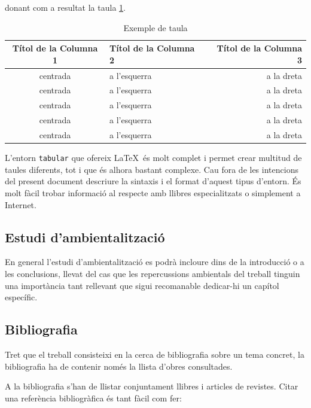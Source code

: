 donant com a resultat la taula \ref{T:prova}.


\begin{table}[htb]
\caption{Exemple de taula}
\begin{center}
\begin{tabular}{|c|l|r|}
\hline
{\bf Títol de la Columna 1} & {\bf Títol de la Columna 2} & {\bf Títol de la Columna 3}  \\ \hline \hline
centrada        & a l'esquerra    & a la dreta       \\ \hline
centrada        & a l'esquerra    & a la dreta       \\ \hline
centrada        & a l'esquerra    & a la dreta       \\ \hline
centrada        & a l'esquerra    & a la dreta       \\ \hline
centrada        & a l'esquerra    & a la dreta       \\ \hline
\end{tabular}
\label{T:prova}
\end{center}
\end{table}

L'entorn \texttt{tabular} que ofereix \LaTeX \ és molt complet i permet crear multitud de taules diferents, tot i que és alhora bastant complexe. Cau fora de les intencions del present document descriure la sintaxis i el format d'aquest tipus d'entorn. És molt fàcil trobar informació al respecte amb llibres especialitzats o simplement a Internet. 


\subsection{Estudi d'ambientalització}

En general l'estudi d'ambientalització es podrà incloure dins de la introducció o a les conclusions, llevat del cas que les repercussions ambientals del treball tinguin una importància tant rellevant que sigui recomanable dedicar-hi un capítol específic.


\subsection{Bibliografia}

Tret que el treball consisteixi en la cerca de bibliografia sobre un tema concret, la bibliografia ha de contenir només la llista d'obres consultades.

A la bibliografia s'han de llistar conjuntament llibres i articles de revistes. Citar una referència bibliogràfica és tant fàcil com fer:

